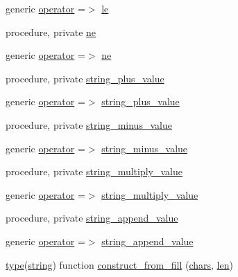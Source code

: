 \begin{DoxyCompactItemize}
generic \hyperlink{structm__strings__oop_1_1string_ac18c4ae9c5afc0f832e18718a03dedab}{operator} =$>$ \hyperlink{structm__strings__oop_1_1string_a1ce3592f3269bc49ddfffc4cb7dc735a}{le}
\item 
procedure, private \hyperlink{structm__strings__oop_1_1string_a290aa120fcc23535f04d2effa01b6e7e}{ne}
\item 
generic \hyperlink{structm__strings__oop_1_1string_a1e081318a04d087b5482edb5ef33ad20}{operator} =$>$ \hyperlink{structm__strings__oop_1_1string_a290aa120fcc23535f04d2effa01b6e7e}{ne}
\item 
procedure, private \hyperlink{structm__strings__oop_1_1string_aa5b3201c931867aebff5d6050f65daaa}{string\+\_\+plus\+\_\+value}
\item 
generic \hyperlink{structm__strings__oop_1_1string_a4fc177a34f239d217be25f6e52e60583}{operator} =$>$ \hyperlink{structm__strings__oop_1_1string_aa5b3201c931867aebff5d6050f65daaa}{string\+\_\+plus\+\_\+value}
\item 
procedure, private \hyperlink{structm__strings__oop_1_1string_a94970c8a39e025ffffb7cdb87621500e}{string\+\_\+minus\+\_\+value}
\item 
generic \hyperlink{structm__strings__oop_1_1string_a4e78105db2bb68c2783dae2e9242030d}{operator} =$>$ \hyperlink{structm__strings__oop_1_1string_a94970c8a39e025ffffb7cdb87621500e}{string\+\_\+minus\+\_\+value}
\item 
procedure, private \hyperlink{structm__strings__oop_1_1string_ac7200a6f9e721f1bc28922c8262523f0}{string\+\_\+multiply\+\_\+value}
\item 
generic \hyperlink{structm__strings__oop_1_1string_af7cc8956f9ca20d06617dac98ceb15dd}{operator} =$>$ \hyperlink{structm__strings__oop_1_1string_ac7200a6f9e721f1bc28922c8262523f0}{string\+\_\+multiply\+\_\+value}
\item 
procedure, private \hyperlink{structm__strings__oop_1_1string_a8e08eb7c69c483503a9169375978cffd}{string\+\_\+append\+\_\+value}
\item 
generic \hyperlink{structm__strings__oop_1_1string_a079d7dd91faba60518e61f0634df7a6f}{operator} =$>$ \hyperlink{structm__strings__oop_1_1string_a8e08eb7c69c483503a9169375978cffd}{string\+\_\+append\+\_\+value}
\item 
\hyperlink{stop__watch_83_8txt_a70f0ead91c32e25323c03265aa302c1c}{type}(\hyperlink{structm__strings__oop_1_1string}{string}) function \hyperlink{structm__strings__oop_1_1string_ab205d416fbeaaec946c2b847683d640e}{construct\+\_\+from\+\_\+fill} (\hyperlink{structm__strings__oop_1_1string_a84c1d60eaee6e6acc2dbee4bce6d64bb}{chars}, \hyperlink{structm__strings__oop_1_1string_acd9093a5a0ca686837cce1908846ae53}{len})
\end{DoxyCompactItemize}
